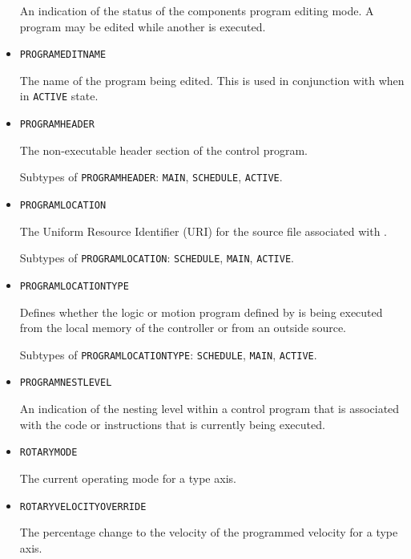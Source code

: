\begin{itemize}
An indication of the status of the  components program editing mode. A program may be edited while another is executed.


\item \texttt{PROGRAM\textunderscore EDIT\textunderscore NAME}  

The name of the program being edited. 
 This is used in conjunction with  when in \texttt{ACTIVE} state. 


\item \texttt{PROGRAM\textunderscore HEADER}  

The non-executable header section of the control program.

Subtypes of \texttt{PROGRAM\textunderscore HEADER}: \texttt{MAIN}, \texttt{SCHEDULE}, \texttt{ACTIVE}.

\item \texttt{PROGRAM\textunderscore LOCATION}  

The Uniform Resource Identifier (URI) for the source file associated with .

Subtypes of \texttt{PROGRAM\textunderscore LOCATION}: \texttt{SCHEDULE}, \texttt{MAIN}, \texttt{ACTIVE}.

\item \texttt{PROGRAM\textunderscore LOCATION\textunderscore TYPE}  

Defines whether the logic or motion program defined by  is being executed from the local memory of the controller or from an outside source.

Subtypes of \texttt{PROGRAM\textunderscore LOCATION\textunderscore TYPE}: \texttt{SCHEDULE}, \texttt{MAIN}, \texttt{ACTIVE}.

\item \texttt{PROGRAM\textunderscore NEST\textunderscore LEVEL}  

An indication of the nesting level within a control program that is associated with the code or instructions that is currently being executed.


\item \texttt{ROTARY\textunderscore MODE}  

The current operating mode for a  type axis.


\item \texttt{ROTARY\textunderscore VELOCITY\textunderscore OVERRIDE}  

The percentage change to the velocity of the programmed velocity for a  type axis.



\end{itemize}

